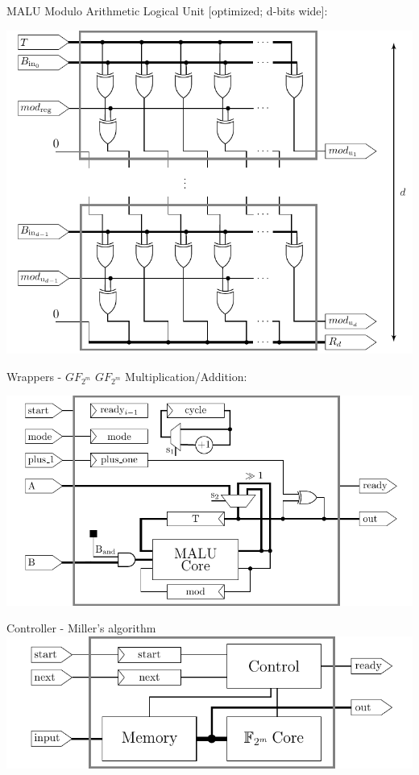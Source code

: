 \documentclass[svgnames, handout,t]{beamer}
\begin{document}
\begin{frame}{MALU}
	Modulo Arithmetic Logical Unit [optimized; d-bits wide]:\\
	\begin{center}
		\includegraphics[height=0.55\paperheight]{images/malu-width-d}
	\end{center}
\end{frame}

\begin{frame}{Wrappers - $GF_{2^m}$}
	$GF_{2^m}$ Multiplication/Addition:\\
	\begin{center}
		\includegraphics[height=0.55\paperheight]{images/wrapper-gf2m}
	\end{center}
\end{frame}

\begin{frame}{Controller - Miller's algorithm}
	\vfill
	\centering
		\includegraphics[width=0.8\paperwidth]{images/controller-miller}
	\vfill
\end{frame}
\end{document}
